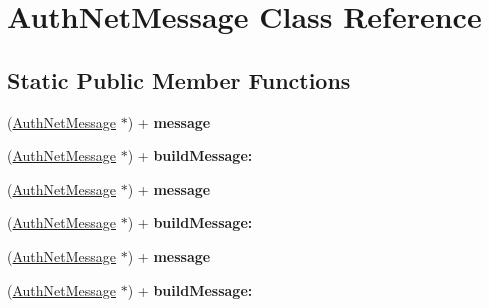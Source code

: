 \hypertarget{interface_auth_net_message}{
\section{AuthNetMessage Class Reference}
\label{interface_auth_net_message}
}
\subsection*{Static Public Member Functions}
\begin{DoxyCompactItemize}
\item 
\hypertarget{interface_auth_net_message_af1e7e88bd8174f77d113dae5e4502ce6}{
(\hyperlink{interface_auth_net_message}{AuthNetMessage} $\ast$) + {\bfseries message}}
\label{interface_auth_net_message_af1e7e88bd8174f77d113dae5e4502ce6}

\item 
\hypertarget{interface_auth_net_message_a13f23347ec5d0c8d3cdf6d4f44f90f32}{
(\hyperlink{interface_auth_net_message}{AuthNetMessage} $\ast$) + {\bfseries buildMessage:}}
\label{interface_auth_net_message_a13f23347ec5d0c8d3cdf6d4f44f90f32}

\item 
\hypertarget{interface_auth_net_message_af1e7e88bd8174f77d113dae5e4502ce6}{
(\hyperlink{interface_auth_net_message}{AuthNetMessage} $\ast$) + {\bfseries message}}
\label{interface_auth_net_message_af1e7e88bd8174f77d113dae5e4502ce6}

\item 
\hypertarget{interface_auth_net_message_a13f23347ec5d0c8d3cdf6d4f44f90f32}{
(\hyperlink{interface_auth_net_message}{AuthNetMessage} $\ast$) + {\bfseries buildMessage:}}
\label{interface_auth_net_message_a13f23347ec5d0c8d3cdf6d4f44f90f32}

\item 
\hypertarget{interface_auth_net_message_af1e7e88bd8174f77d113dae5e4502ce6}{
(\hyperlink{interface_auth_net_message}{AuthNetMessage} $\ast$) + {\bfseries message}}
\label{interface_auth_net_message_af1e7e88bd8174f77d113dae5e4502ce6}

\item 
\hypertarget{interface_auth_net_message_a13f23347ec5d0c8d3cdf6d4f44f90f32}{
(\hyperlink{interface_auth_net_message}{AuthNetMessage} $\ast$) + {\bfseries buildMessage:}}
\label{interface_auth_net_message_a13f23347ec5d0c8d3cdf6d4f44f90f32}

\end{DoxyCompactItemize}
